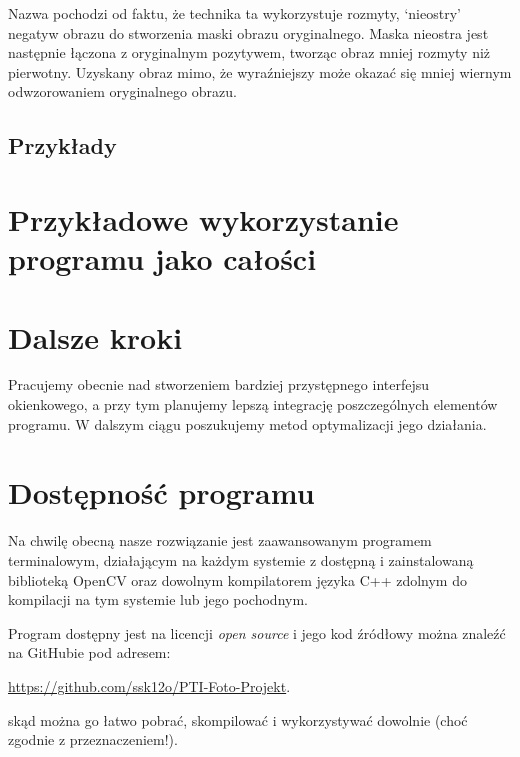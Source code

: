 \documentclass[]{mwart}
\begin{document}
Nazwa pochodzi od faktu, że technika ta wykorzystuje rozmyty,
`nieostry' negatyw obrazu do stworzenia maski obrazu oryginalnego.
Maska nieostra jest następnie łączona z oryginalnym pozytywem,
tworząc obraz mniej rozmyty niż pierwotny. Uzyskany obraz mimo, że wyraźniejszy
może okazać się mniej wiernym odwzorowaniem oryginalnego obrazu.

\subsection{Przykłady}








\section{Przykładowe wykorzystanie programu jako całości}







\newpage

\section{Dalsze kroki}
Pracujemy obecnie nad stworzeniem bardziej przystępnego interfejsu okienkowego, a przy tym
planujemy lepszą integrację poszczególnych elementów programu.
W dalszym ciągu poszukujemy metod optymalizacji jego działania.

\section{Dostępność programu}
Na chwilę obecną nasze rozwiązanie jest zaawansowanym programem terminalowym,
działającym na każdym systemie z dostępną i zainstalowaną biblioteką OpenCV oraz
dowolnym kompilatorem języka C++ zdolnym do kompilacji na tym systemie lub jego pochodnym.

Program dostępny jest na licencji \textit{open source} i jego kod źródłowy można znaleźć na GitHubie
pod adresem:
\begin{center}
    \url{https://github.com/ssk12o/PTI-Foto-Projekt}.
\end{center}
skąd można go łatwo pobrać, skompilować i wykorzystywać dowolnie (choć zgodnie z przeznaczeniem!).




\newpage
\end{document}

